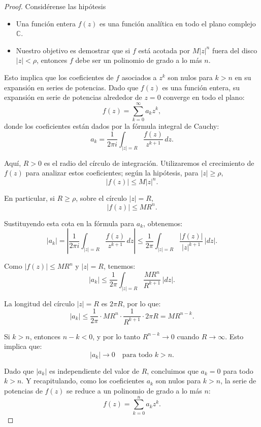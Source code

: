 \documentclass{article}
\begin{document}
\begin{proof}

Considérense las hipótesis
\begin{itemize}
    \item Una función entera \( f(z) \) es una función analítica en todo el plano complejo \( \mathbb{C} \).
   \item Nuestro objetivo es demostrar que si \( f \) está acotada por \( M|z|^n \) fuera del disco \( |z| < \rho \), entonces \( f \) debe ser un polinomio de grado a lo más \( n \).
\end{itemize}

   Esto implica que los coeficientes de \( f \) asociados a \( z^k \) son nulos para \( k > n \) en su expansión en series de potencias. Dado que \( f(z) \) es una función entera, su expansión en serie de potencias alrededor de \( z = 0 \) converge en todo el plano:
   \[
   f(z) = \sum_{k=0}^\infty a_k z^k,
   \]
   donde los coeficientes están dados por la fórmula integral de Cauchy:
   \[
   a_k = \frac{1}{2\pi i} \int_{|z|=R} \frac{f(z)}{z^{k+1}} \, dz.
   \]

   Aquí, \( R > 0 \) es el radio del círculo de integración. Utilizaremos el crecimiento de \( f(z) \) para analizar estos coeficientes; según la hipótesis, para \( |z| \geq \rho \),
   \[
   |f(z)| \leq M |z|^n.
   \]

   En particular, si \( R \geq \rho \), sobre el círculo \( |z| = R \),
   \[
   |f(z)| \leq M R^n.
   \]

   Sustituyendo esta cota en la fórmula para \( a_k \), obtenemos:
   \[
   |a_k| = \left| \frac{1}{2\pi i} \int_{|z|=R} \frac{f(z)}{z^{k+1}} \, dz \right| \leq \frac{1}{2\pi} \int_{|z|=R} \frac{|f(z)|}{|z|^{k+1}} \, |dz|.
   \]

   Como \( |f(z)| \leq M R^n \) y \( |z| = R \), tenemos:
   \[
   |a_k| \leq \frac{1}{2\pi} \int_{|z|=R} \frac{M R^n}{R^{k+1}} \, |dz|.
   \]

   La longitud del círculo \( |z| = R \) es \( 2\pi R \), por lo que:
   \[
   |a_k| \leq \frac{1}{2\pi} \cdot M R^n \cdot \frac{1}{R^{k+1}} \cdot 2\pi R = M R^{n-k}.
   \]

   Si \( k > n \), entonces \( n - k < 0 \), y por lo tanto \( R^{n-k} \to 0 \) cuando \( R \to \infty \). Esto implica que:
   \[
   |a_k| \to 0 \quad \text{para todo } k > n.
   \]

   Dado que \( |a_k| \) es independiente del valor de \( R \), concluimos que \( a_k = 0 \) para todo \( k > n \). Y recapitulando, como los coeficientes \( a_k \) son nulos para \( k > n \), la serie de potencias de \( f(z) \) se reduce a un polinomio de grado a lo más \( n \):
   \[
   f(z) = \sum_{k=0}^n a_k z^k.
   \]
\end{proof}
\end{document}
